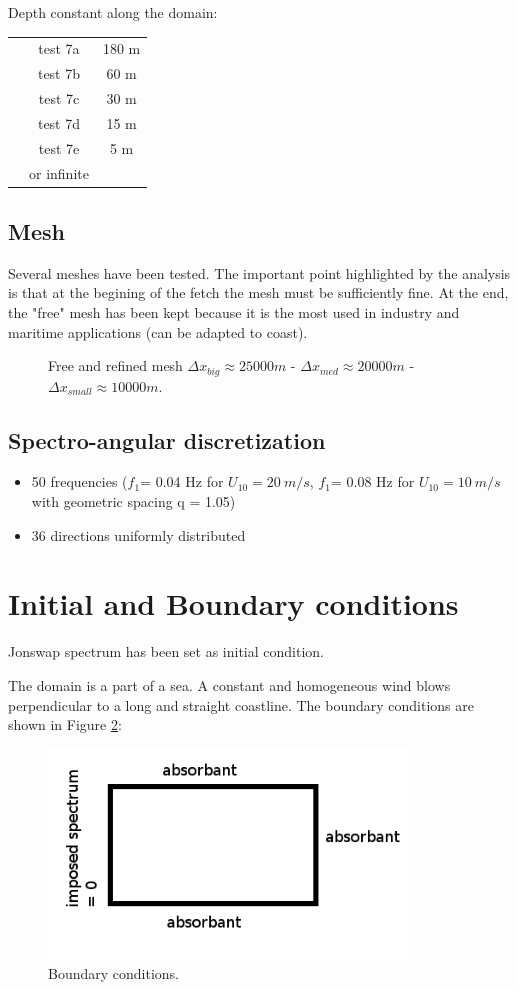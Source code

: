 Depth constant along the domain:
\begin{tabular}{ccc}
 & test 7a & 180 m\\
 & test 7b & 60 m\\
& test 7c & 30 m\\
& test 7d & 15 m\\
& test 7e & 5 m\\
 & or infinite\\
\end{tabular}
\subsection{Mesh}
Several meshes have been tested. The important point highlighted by the
analysis is that at the begining of the fetch the mesh must be sufficiently
fine. At the end, the "free" mesh has been kept because it is the most used in
industry and maritime applications (can be adapted to coast).
\begin{figure}[H]
\centering
\caption{Free and refined mesh $\Delta x_{big} \approx 25 000 m$ -
  $\Delta x_{med} \approx 20 000 m$ - $\Delta x_{small} \approx 10 000 m$.}
\label{meshfet}
\end{figure}

\subsection{Spectro-angular discretization}
\begin{itemize}
\item 50 frequencies ($f_1 $= 0.04 Hz for $U_{10} = 20~m/s$, $f_1 $= 0.08 Hz
  for $U_{10} = 10~m/s$ with geometric spacing q = 1.05)
\item 36 directions uniformly distributed
\end{itemize}

\section{Initial and Boundary conditions}
Jonswap spectrum has been set as initial condition.

The domain is a part of a sea. A constant and homogeneous wind blows
perpendicular to a long and straight coastline. The boundary conditions are
shown in Figure \ref{boundaryfet}:
\begin{figure}
\centering
\includegraphics[width=0.85\textwidth]{boundarycond.jpg}
\caption{Boundary conditions.}
\label{boundaryfet}
\end{figure}

